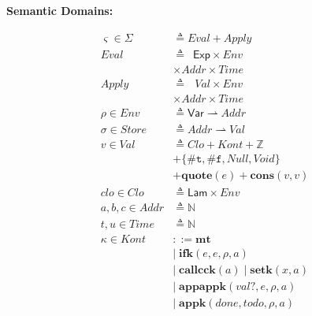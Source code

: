 \documentclass[12pt,draft]{article}
\newcommand{\truesyn}{\texttt{\#t}}
\newcommand{\falsesyn}{\texttt{\#f}}
\begin{document}
\begin{multicols*}{2}
\begin{center}
\textbf{Semantic Domains:}
\end{center}
\vspace{-18mm}
\begin{center}
\begin{align*}
\varsigma \in \Sigma &\triangleq \textit{Eval} + \textit{Apply} \\
\textit{Eval} &\triangleq \:\;\textsf{Exp} \times \textit{Env} \\
						& \times \textit{Addr} \times \textit{Time} \\
\textit{Apply} &\triangleq \:\;\,\textit{Val} \times \textit{Env} \\
						& \times \textit{Addr} \times \textit{Time} \\
\rho \in \textit{Env} &\triangleq \textsf{Var} \rightharpoonup 
												\textit{Addr} \\
\sigma \in \textit{Store} &\triangleq \textit{Addr} \rightharpoonup
													\textit{Val} \\
v \in \textit{Val} &\triangleq \textit{Clo} + \textit{Kont} + \mathbb{Z} \\
				&+ \{ \truesyn,\falsesyn, \textit{Null} , \textit{Void} \} \\
				&+ \textbf{quote}(e) + \textbf{cons}(v, v) \\
clo \in \textit{Clo} &\triangleq \textsf{Lam} \times \textit{Env} \\
a,b,c \in \textit{Addr} &\triangleq \mathbb{N} \\
t,u \in \textit{Time} &\triangleq \mathbb{N} \\
\kappa \in \textit{Kont} &::= \textbf{mt} \\
        &|\; \textbf{ifk}(e, e, \rho, a) \\
        &|\; \textbf{callcck}(a)\;|\; \textbf{setk}(x, a) \\
        &|\; \textbf{appappk}(val?, e, \rho, a) \\
        &|\; \textbf{appk}(done, todo, \rho, a) \\

\end{align*}
\end{center}
\end{multicols*}
\end{document}
